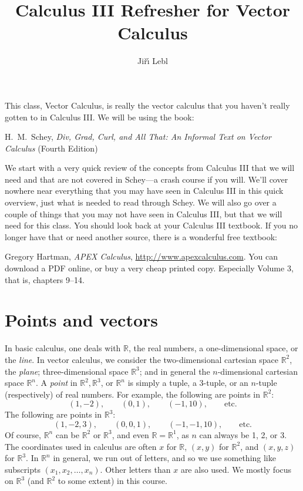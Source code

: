 \documentclass[12pt]{article}
\newcommand{\R}{{\mathbb{R}}}
\begin{document}
\title{Calculus III Refresher for Vector Calculus}
\author{Ji\v{r}\'\i{} Lebl}

\maketitle


This class, Vector Calculus, is really the vector calculus that you haven't
really gotten to in Calculus III.
We will be using the book:

\medskip

\noindent
H.\ M.\ Schey,
\emph{Div, Grad, Curl, and All That: An Informal Text on Vector Calculus} (Fourth Edition)

\medskip

We start with a very quick review of the concepts
from Calculus III that we will
need and that are not covered in Schey---a crash course if you will.
We'll cover nowhere near everything that you may have seen in Calculus III in this quick overview,
just what is needed to read through Schey.
We will also go over a couple of things that you may not have seen
in Calculus III, but that we will need for this class.
You should look back at your Calculus III textbook.  If you no longer have that or need another source, there is a wonderful free textbook:

\medskip

\noindent
Gregory Hartman, \emph{APEX Calculus}, \url{http://www.apexcalculus.com}.  You can download a PDF online, or buy a very cheap printed copy.  Especially Volume 3, that is, chapters 9--14.


\section{Points and vectors}

In basic calculus, one deals with $\R$, the real numbers, a one-dimensional space, or the \emph{line}.
In vector calculus, we consider the two-dimensional cartesian space $\R^2$,
the \emph{plane};
three-dimensional space $\R^3$; and in general the $n$-dimensional cartesian space $\R^n$.
A \emph{point} in $\R^2, \R^3$, or $\R^n$ is simply a tuple,
a 3-tuple, or an $n$-tuple (respectively) of real numbers.
For example, the following are points in $\R^2$:
\[
(1,-2), \qquad (0,1), \qquad (-1,10), \qquad \text{etc.}
\]
The following are points in $\R^3$:
\[
(1,-2,3), \qquad (0,0,1), \qquad (-1,-1,10), \qquad \text{etc.}
\]
Of course, $\R^n$ can be $\R^2$ or $\R^3$, and even $\R = \R^1$, as $n$ can always be
1, 2, or 3.
The coordinates used in calculus are often $x$ for $\R$, $(x,y)$ for $\R^2$, and $(x,y,z)$
for $\R^3$.
In $\R^n$ in general, we run out of letters, and so we use something like
subscripts $(x_1,x_2,\ldots,x_n)$.  Other letters than $x$ are also used.
We mostly focus on $\R^3$ (and $\R^2$ to some extent) in this course.
\end{document}

